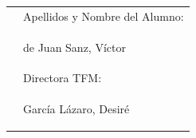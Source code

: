 \begin{titlepage}
\begin{center}
\end{center}
\begin{tabular}{p{4cm}p{10cm}}
 &  Apellidos y Nombre del Alumno:\\

 &  \vspace{-0.8cm}\begin{mdframed}\quad\quad de Juan Sanz, Víctor\hfill\end{mdframed}\\
 &  \vspace{-0.6cm}Directora TFM:\\
 &  \vspace{-1.1cm}\begin{mdframed}\quad\quad García Lázaro, Desiré\hfill\end{mdframed}
\end{tabular}


\end{titlepage}




\newpage
\mbox{}
\thispagestyle{empty} %

